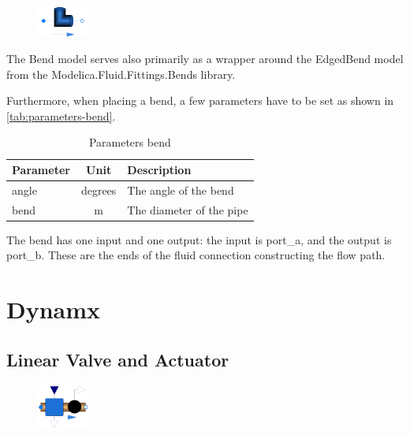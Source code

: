 \documentclass[we,final,11pt,oneside,openany]{uantwerpenbamathesis}
\begin{document}
\begin{figure}
    \centering
    \includegraphics[width=0.15\textwidth]{Images/components/bend}
\end{figure}

The Bend model serves also primarily as a wrapper around the EdgedBend model from the Modelica.Fluid.Fittings.Bends library.

Furthermore, when placing a bend, a few parameters have to be set as shown in \autoref{tab:parameters-bend}.
\begin{table}[h!]
    \centering
    \begin{tabular}{|lcl|}
        \hline
        \multicolumn{1}{|l|}{\textbf{Parameter}}     & \multicolumn{1}{c|}{\textbf{Unit}} & \textbf{Description}     \\ \hline
        \multicolumn{1}{|l|}{angle}                  & \multicolumn{1}{c|}{degrees}       & The angle of the bend    \\ \hline
        \multicolumn{1}{|l|}{bend}                   & \multicolumn{1}{c|}{m}             & The diameter of the pipe \\ \hline
    \end{tabular}
    \caption{Parameters bend}
    \label{tab:parameters-bend}
\end{table}

The bend has one input and one output: the input is port\_a, and the output is port\_b.
These are the ends of the fluid connection constructing the flow path.

\newpage

\section{Dynamx}
\label{sec:dynamx}

\subsection{Linear Valve and Actuator}
\label{subsec:linear-valve-and-actuator}

\begin{figure}
    \centering
    \includegraphics[width=0.15\textwidth]{Images/components/dynamx}
\end{figure}
\end{document}
